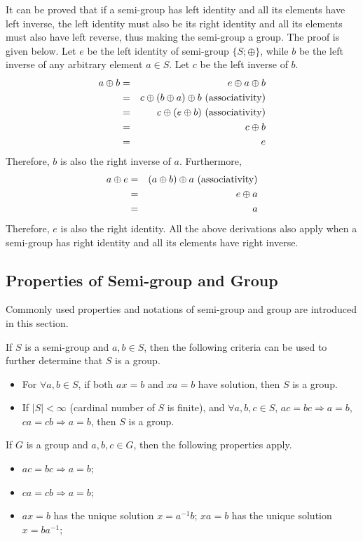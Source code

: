 It can be proved that if a semi-group has left identity and all its elements have left inverse, the left identity must also be its right identity and all its elements must also have left reverse, thus making the semi-group a group. The proof is given below. Let $e$ be the left identity of semi-group $\{S;\oplus \}$, while $b$ be the left inverse of any arbitrary element $a\in S$. Let $c$ be the left inverse of $b$.
\begin{eqnarray}
a\oplus b &=& e\oplus a\oplus b \nonumber \\
   &=& c\oplus (b\oplus a)\oplus b ~\textup{(associativity)} \nonumber \\
   &=& c\oplus (e\oplus b) ~\textup{(associativity)} \nonumber \\ 
   &=& c\oplus b \nonumber \\ 
   &=& e \nonumber
\end{eqnarray}
Therefore, $b$ is also the right inverse of $a$. Furthermore,
\begin{eqnarray}
a\oplus e &=& (a\oplus b)\oplus a ~\textup{(associativity)} \nonumber \\
   &=& e\oplus a \nonumber \\
   &=& a \nonumber
\end{eqnarray}
Therefore, $e$ is also the right identity. All the above derivations also apply when a semi-group has right identity and all its elements have right inverse.

\subsection{Properties of Semi-group and Group}

Commonly used properties and notations of semi-group and group are introduced in this section.

If $S$ is a semi-group and $a, b \in S$, then the following criteria can be used to further determine that $S$ is a group.
\begin{itemize}
  \item For $\forall a, b \in S$, if both $ax = b$ and $xa = b$ have solution, then $S$ is a group.
  \item If $|S|<\infty$ (cardinal number of $S$ is finite), and $\forall a, b, c \in S$, $ac = bc \Rightarrow a = b$, $ca = cb \Rightarrow a = b$, then $S$ is a group.
\end{itemize}

If $G$ is a group and $a, b, c \in G$, then the following properties apply. 
\begin{itemize}
  \item $ac = bc \Rightarrow a = b$;
  \item $ca = cb \Rightarrow a = b$;
  \item $ax = b$ has the unique solution $x = a^{-1}b$; $xa = b$ has the unique solution $x = ba^{-1}$;
\end{itemize}

